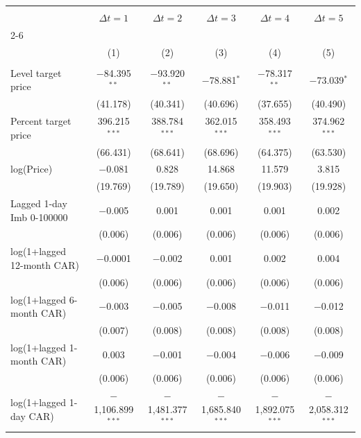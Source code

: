 
\begin{tabular}{@{\extracolsep{5pt}}lccccc} 
\\[-1.8ex]\hline 
\hline \\[-1.8ex] 
 & \multicolumn{1}{c}{\textbf{$\Delta t = 1$}} & \multicolumn{1}{c}{\textbf{$\Delta t = 2$}} & \multicolumn{1}{c}{\textbf{$\Delta t = 3$}} & \multicolumn{1}{c}{\textbf{$\Delta t = 4$}} & \multicolumn{1}{c}{\textbf{$\Delta t = 5$}} \\
\cline{2-6} 
\\[-1.8ex] & (1) & (2) & (3) & (4) & (5)\\ 
\hline \\[-1.8ex] 
 Level target price & $-$84.395$^{**}$ & $-$93.920$^{**}$ & $-$78.881$^{*}$ & $-$78.317$^{**}$ & $-$73.039$^{*}$ \\ 
  & (41.178) & (40.341) & (40.696) & (37.655) & (40.490) \\ 
  Percent target price & 396.215$^{***}$ & 388.784$^{***}$ & 362.015$^{***}$ & 358.493$^{***}$ & 374.962$^{***}$ \\ 
  & (66.431) & (68.641) & (68.696) & (64.375) & (63.530) \\ 
  log(Price) & $-$0.081 & 0.828 & 14.868 & 11.579 & 3.815 \\ 
  & (19.769) & (19.789) & (19.650) & (19.903) & (19.928) \\ 
  Lagged 1-day Imb 0-100000 & $-$0.005 & 0.001 & 0.001 & 0.001 & 0.002 \\ 
  & (0.006) & (0.006) & (0.006) & (0.006) & (0.006) \\ 
  log(1+lagged 12-month CAR) & $-$0.0001 & $-$0.002 & 0.001 & 0.002 & 0.004 \\ 
  & (0.006) & (0.006) & (0.006) & (0.006) & (0.006) \\ 
  log(1+lagged 6-month CAR) & $-$0.003 & $-$0.005 & $-$0.008 & $-$0.011 & $-$0.012 \\ 
  & (0.007) & (0.008) & (0.008) & (0.008) & (0.008) \\ 
  log(1+lagged 1-month CAR) & 0.003 & $-$0.001 & $-$0.004 & $-$0.006 & $-$0.009 \\ 
  & (0.006) & (0.006) & (0.006) & (0.006) & (0.006) \\ 
  log(1+lagged 1-day CAR) & $-$1,106.899$^{***}$ & $-$1,481.377$^{***}$ & $-$1,685.840$^{***}$ & $-$1,892.075$^{***}$ & $-$2,058.312$^{***}$ \\ 

\end{tabular}
